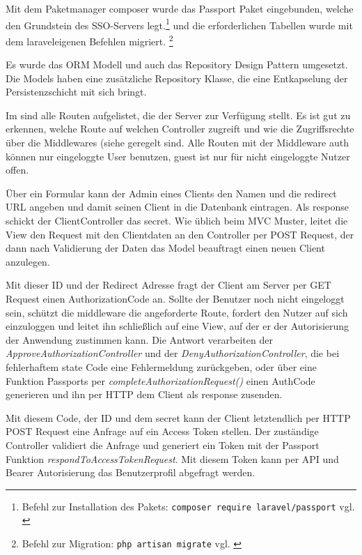 Mit dem Paketmanager composer wurde das Passport Paket eingebunden, welche den Grundstein des SSO-Servers legt.\footnote{Befehl zur Installation des Pakets: \texttt{composer require laravel/passport} vgl. \cite{composer}} und die erforderlichen Tabellen wurde mit dem laraveleigenen Befehlen migriert. \footnote{Befehl zur Migration: \texttt{php artisan migrate} vgl. \cite{Laravel}}

Es wurde das ORM Modell und auch das Repository Design Pattern umgesetzt. Die Models haben eine zusätzliche  Repository Klasse, die eine Entkapselung der Persistenzschicht mit sich bringt.

Im  sind alle Routen aufgelistet, die der Server zur Verfügung stellt. Es ist gut zu erkennen, welche Route auf welchen Controller zugreift und wie die Zugriffsrechte über die Middlewares (siehe  geregelt sind. Alle Routen mit der Middleware auth können nur eingeloggte User benutzen, guest ist nur für nicht eingeloggte Nutzer offen.

Über ein Formular kann der Admin eines Clients den Namen und die redirect URL angeben und damit seinen Client in die Datenbank eintragen. Als response schickt der ClientController das secret.
Wie üblich beim MVC Muster, leitet die View den Request mit den Clientdaten an den Controller per POST Request, der dann nach Validierung der Daten das Model beauftragt einen neuen Client anzulegen. 

Mit dieser ID und der Redirect Adresse fragt der Client am Server per GET Request einen AuthorizationCode an. Sollte der Benutzer noch nicht eingeloggt sein, schützt die middleware die angeforderte Route, fordert den Nutzer auf sich einzuloggen und leitet ihn schließlich auf eine View, auf der er der Autorisierung der Anwendung zustimmen kann. Die Antwort verarbeiten der \textit{ApproveAuthorizationController} und der \textit{DenyAuthorizationController}, die bei fehlerhaftem state Code eine Fehlermeldung zurückgeben, oder über eine Funktion Passports per \textit{completeAuthorizationRequest()} einen AuthCode generieren und ihn per HTTP dem Client als response zusenden.

Mit diesem Code, der ID und dem secret kann der Client letztendlich per HTTP POST Request eine Anfrage auf ein Access Token stellen. Der zuständige Controller validiert die Anfrage und generiert ein Token mit der Passport Funktion \textit{respondToAccessTokenRequest}. Mit diesem Token kann per API und Bearer Autorisierung das Benutzerprofil abgefragt werden.


